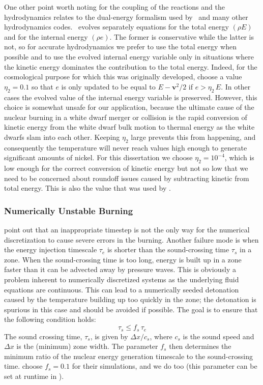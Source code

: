 \documentclass[12pt]{article}
\begin{document}
One other point worth noting for the coupling of the reactions
and the hydrodynamics relates to the dual-energy formalism \citep{ENZO} used
by \castro\ and many other hydrodynamics codes.
\castro\ evolves separately equations for the total energy $(\rho E)$ and
for the internal energy $(\rho e)$. The former is conservative while the latter
is not, so for accurate hydrodynamics we prefer to use the total
energy when possible and to use the evolved internal energy variable
only in situations where the kinetic energy dominates the contribution
to the total energy. Indeed, for the cosmological purpose for which
this was originally developed, \cite{bryan:1995} choose a value $\eta_2 = 0.1$
so that $e$ is only updated to be equal to $E - \mathbf{v}^2/2$ if
$e > \eta_2\, E$. In other cases the evolved value of the internal
energy variable is preserved. However, this choice is somewhat unsafe
for our application, because the ultimate cause of the nuclear
burning in a white dwarf merger or collision is the rapid conversion of
kinetic energy from the white dwarf bulk motion to thermal energy
as the white dwarfs slam into each other. Keeping $\eta_2$ large
prevents this from happening, and consequently the temperature
will never reach values high enough to generate significant
amounts of nickel. For this dissertation we choose $\eta_2 = 10^{-4}$,
which is low enough for the correct conversion of kinetic energy
but not so low that we need to be concerned about roundoff issues
caused by subtracting kinetic from total energy. This is also
the value that was used by \cite{hawley:2012}.

\subsubsection{Numerically Unstable Burning}
\label{sec:unstable_burning}

\citet{kushnir:2013} point out that an inappropriate timestep is
not the only way for the numerical discretization to cause
severe errors in the burning. Another failure mode is when
the energy injection timescale
$\tau_e$ is shorter than the sound-crossing time $\tau_s$ in a zone.
When the sound-crossing time is too long, energy is built up in
a zone faster than it can be advected away by pressure waves.
This is obviously a problem inherent to numerically discretized
systems as the underlying fluid equations are continuous.
This can lead to a numerically seeded detonation caused by the
temperature building up too quickly in the zone; the detonation
is spurious in this case and should be avoided if possible.
The goal is to ensure that the following condition holds:
\begin{equation}
  \tau_s \leq f_{s}\, \tau_e \label{eq:burning_limiter_2}
\end{equation}
The sound crossing time, $\tau_s$, is given by $\Delta x / c_s$,
where $c_s$ is the sound speed and $\Delta x$ is the (minimum)
zone width. The parameter $f_{s}$ then determines the minimum
ratio of the nuclear energy generation timescale to the
sound-crossing time. \citet{kushnir:2013} choose $f_{s} = 0.1$
for their simulations, and we do too (this parameter can be set
at runtime in \castro).
\end{document}

